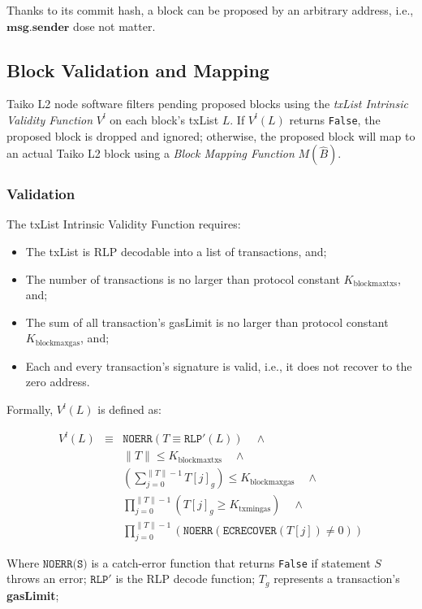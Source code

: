 \documentclass[9pt,oneside]{amsart}
\begin{document}
\begin{multicols}{2}
Thanks to its commit hash, a block can be proposed by an arbitrary address, i.e., $\mathbf{msg.sender}$ dose not matter.

\subsection{Block Validation and Mapping } \label{sec:filtermap}
Taiko L2 node software filters pending proposed blocks using the \textit{txList Intrinsic Validity Function} $V^l$ on each block's txList $L$. If $V^l(L)$ returns \texttt{False}, the proposed block is dropped and ignored; otherwise, the proposed block will map to an actual Taiko L2 block using a \textit{Block Mapping Function} $M(\hat{B})$.

\subsubsection{Validation} The txList Intrinsic Validity Function requires:

\begin{itemize}
\item The txList is RLP decodable into a list of transactions, and;
\item The number of transactions is no larger than  protocol constant $ K_{\mathrm{blockmaxtxs}}$, and;
\item The sum of all transaction's gasLimit is no larger than protocol constant $K_{\mathrm{blockmaxgas}}$, and;
\item Each and every transaction's signature is valid, i.e., it does not recover to the zero address.
\end{itemize}

Formally, $V^l(L)$ is defined as:


\begin{eqnarray}
V^l(L) & \equiv & \texttt{NOERR}(T \equiv \texttt{RLP}'(L))  \quad \wedge  \\
\nonumber& & \lVert T \rVert \le K_{\mathrm{blockmaxtxs}} \quad \wedge \\
\nonumber & & (\sum_{j = 0}^{\lVert T \rVert - 1}T[j]_g) \le K_{\mathrm{blockmaxgas}} \quad \wedge \\
\nonumber & & \prod_{j = 0}^{\lVert T \rVert - 1} (T[j]_g \ge K_{\mathrm{txmingas}})\quad \wedge \\
\nonumber & & \prod_{j = 0}^{\lVert T \rVert - 1} (\texttt{NOERR}(\texttt{ECRECOVER}(T[j]) \ne 0) )
\end{eqnarray}

Where $\texttt{NOERR(S)}$ is a catch-error function that returns \texttt{False} if statement $S$ throws an error; $\texttt{RLP}'$ is the RLP decode function;  $T_g$ represents a transaction's \textbf{gasLimit}; 






\end{multicols}
\end{document}
